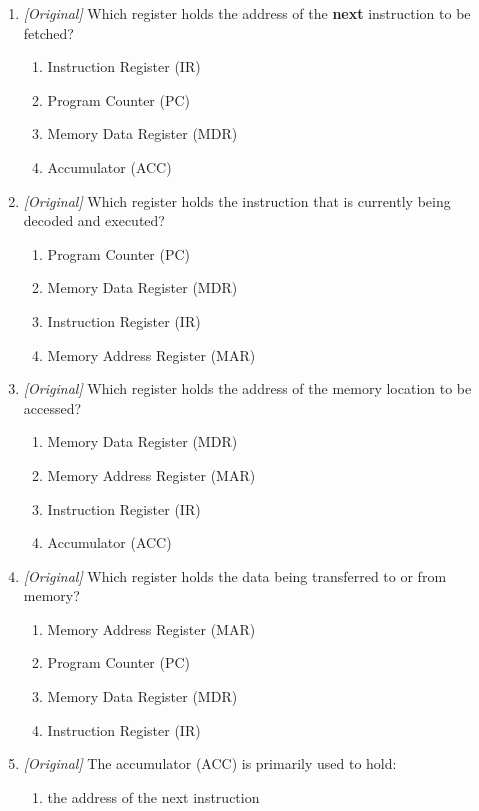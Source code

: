 \documentclass[11pt]{article}
\begin{document}
\begin{enumerate}[label=\textbf{Q\arabic*.}, leftmargin=*]
\begin{enumerate}[label=\Alph*.]
  \end{enumerate}
\item \textit{[Original]} Which register holds the address of the
  \textbf{next} instruction to be fetched?
  \begin{enumerate}[label=\Alph*.]
    \item Instruction Register (IR)
    \item Program Counter (PC)
    \item Memory Data Register (MDR)
    \item Accumulator (ACC)
  \end{enumerate}
\item \textit{[Original]} Which register holds the instruction that is
  currently being decoded and executed?
  \begin{enumerate}[label=\Alph*.]
    \item Program Counter (PC)
    \item Memory Data Register (MDR)
    \item Instruction Register (IR)
    \item Memory Address Register (MAR)
  \end{enumerate}
\item \textit{[Original]} Which register holds the address of the memory
  location to be accessed?
  \begin{enumerate}[label=\Alph*.]
    \item Memory Data Register (MDR)
    \item Memory Address Register (MAR)
    \item Instruction Register (IR)
    \item Accumulator (ACC)
  \end{enumerate}
\item \textit{[Original]} Which register holds the data being transferred to
  or from memory?
  \begin{enumerate}[label=\Alph*.]
    \item Memory Address Register (MAR)
    \item Program Counter (PC)
    \item Memory Data Register (MDR)
    \item Instruction Register (IR)
  \end{enumerate}
\item \textit{[Original]} The accumulator (ACC) is primarily used to hold:
  \begin{enumerate}[label=\Alph*.]
    \item the address of the next instruction

\end{enumerate}
\end{enumerate}
\end{document}
